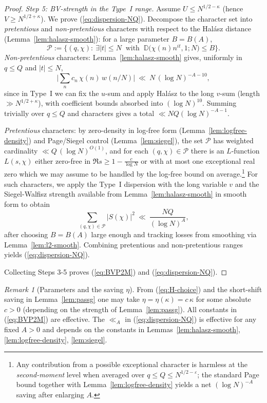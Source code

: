 \documentclass[11pt]{article}
\def\eqref#1{(\ref{#1})}%
\theoremstyle{definition}
\theoremstyle{remark}
\newtheorem{remark}[lemma]{Remark}
\numberwithin{equation}{part}
\begin{document}
\begin{proof}
	\smallskip
	\emph{Step 5: BV-strength in the Type~I range.}
	Assume $U\le N^{1/2-\kappa}$ (hence $V\ge N^{1/2+\kappa}$). We prove \eqref{eq:dispersion-NQ}. Decompose the character set into \emph{pretentious} and \emph{non-pretentious} characters with respect to the Halász distance (Lemma~\ref{lem:halasz-smooth}): for a large parameter $B=B(A)$,
	\[
		\mathcal P:=\Big\{(q,\chi):\ \exists |t|\le N \ \text{ with }\ \mathbb D\big(\chi(n)n^{it},1;N\big)\le B\Big\}.
	\]
	\emph{Non-pretentious} characters: Lemma~\ref{lem:halasz-smooth} gives, uniformly in $q\le Q$ and $|t|\le N$,
	\[
		\Big|\sum_{n}c_n\,\chi(n)\,w(n/N)\Big|\ \ll\ N\,(\log N)^{-A-10},
	\]
	since in Type~I we can fix the $u$-sum and apply Halász to the long $v$-sum (length $\gg N^{1/2+\kappa}$), with coefficient bounds absorbed into $(\log N)^{10}$. Summing trivially over $q\le Q$ and characters gives a total $\ll NQ(\log N)^{-A-1}$.

	\emph{Pretentious} characters: by zero-density in log-free form (Lemma~\ref{lem:logfree-density}) and Page/Siegel control (Lemma~\ref{lem:siegel}), the set $\mathcal P$ has weighted cardinality $\ll Q\,(\log N)^{O(1)}$, and for each $(q,\chi)\in\mathcal P$ there is an $L$-function $L(s,\chi)$ either zero-free in $\Re s\ge 1-\tfrac{c}{\log N}$ or with at most one exceptional real zero which we may assume to be handled by the log-free bound on average.\footnote{Any contribution from a possible exceptional character is harmless at the \emph{second-moment} level when averaged over $q\le Q\le N^{1/2-\varepsilon}$; the standard Page bound together with Lemma~\ref{lem:logfree-density} yields a net $(\log N)^{-A}$ saving after enlarging $A$.}
	For such characters, we apply the Type~I dispersion with the long variable $v$ and the Siegel-Walfisz strength available from Lemma~\ref{lem:halasz-smooth} in smooth form to obtain
	\[
		\sum_{(q,\chi)\in\mathcal P}\big|S(\chi)\big|^2\ \ll\ \frac{NQ}{(\log N)^{A}},
	\]
	after choosing $B=B(A)$ large enough and tracking losses from smoothing via Lemma~\ref{lem:l2-smooth}. Combining pretentious and non-pretentious ranges yields \eqref{eq:dispersion-NQ}.

	\smallskip
	Collecting Steps 3-5 proves \eqref{eq:BVP2M} and \eqref{eq:dispersion-NQ}.
\end{proof}

\begin{remark}[Parameters and the saving $\eta$]\label{rem:eta}
	From \eqref{eq:H-choice} and the short-shift saving in Lemma~\ref{lem:passg} one may take
	\(
	\eta=\eta(\kappa)=c\,\kappa
	\)
	for some absolute $c>0$ (depending on the strength of Lemma~\ref{lem:passg}). All constants in \eqref{eq:BVP2M} are effective. The $\ll_A$ in \eqref{eq:dispersion-NQ} is effective for any fixed $A>0$ and depends on the constants in Lemmas~\ref{lem:halasz-smooth}, \ref{lem:logfree-density}, \ref{lem:siegel}.
\end{remark}
\end{document}
